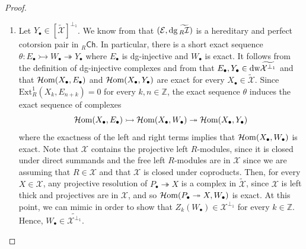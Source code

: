 \documentclass[10pt,reqno]{amsart}
\numberwithin{equation}{section}
\theoremstyle{remark}
\newcommand{\Ext}{\mathrm{Ext}}
\newcommand{\X}{\mathcal{X}}
\begin{document}
\begin{proof}
\begin{enumerate}[(1)]
\item Let $Y_{\bullet} \in [\widetilde{\X}]^{\perp _1}$. We know from \cite[Prop. 2.3.25]{GRcomplexes} that $(\mathcal{E}, {\rm dg}\,\widetilde{{}_R\mathcal{I}})$ is a hereditary and perfect cotorsion pair in ${}_R\mathsf{Ch}$. In particular, there is a short exact sequence $\theta \colon E_\bullet \rightarrowtail W_\bullet \twoheadrightarrow Y_\bullet$ where $E_\bullet$ is dg-injective and $W_\bullet$ is exact. It follows from the definition of dg-injective complexes and from \cite[dual of Lem. 5.38 (3)]{HMP-n-cot} that $E_\bullet, Y_\bullet \in {\rm dw}\widetilde{\X^{\perp_1}}$ and that $\mathcal{H}{\rm om}(X_\bullet,E_\bullet)$ and $\mathcal{H}{\rm om}(X_\bullet,Y_\bullet)$ are exact for every $X_\bullet \in \widetilde{\X}$. Since $\Ext^1_R(X_k,E_{n+k}) = 0$ for every $k, n \in \mathbb{Z}$, the exact sequence $\theta$ induces the exact sequence of complexes
\[
\mathcal{H}{\rm om}(X_\bullet,E_\bullet) \rightarrowtail \mathcal{H}{\rm om}(X_\bullet, W_\bullet) \twoheadrightarrow \mathcal{H}{\rm om}(X_\bullet,Y_\bullet)
\]
where the exactness of the left and right terms implies that $\mathcal{H}{\rm om}(X_\bullet, W_\bullet)$ is exact. Note that $\X$ contains the projective left $R$-modules, since it is closed under direct summands and the free left $R$-modules are in $\X$ since we are assuming that $R \in \X$ and that $\X$ is closed under coproducts. Then, for every $X \in \X$, any projective resolution of $P_\bullet \twoheadrightarrow X$ is a complex in $\widetilde{\X}$, since $\X$ is left thick and projectives are in $\X$, and so $\mathcal{H}{\rm om}(P_\bullet \twoheadrightarrow X,W_\bullet)$ is exact. At this point, we can mimic \cite[proof of Thm. 3.12]{GillespieFlat} in order to show that $Z_k(W_\bullet) \in \X^{\perp_1}$ for every $k \in \mathbb{Z}$. Hence, $W_\bullet \in \widetilde{\X^{\perp_1}}$. 


\end{enumerate}
\end{proof}
\end{document}
